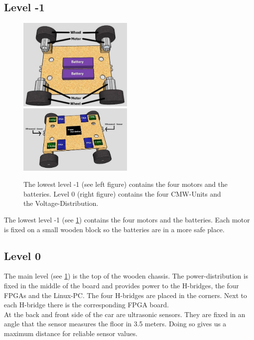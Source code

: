 \subsection{Level -1}

\begin{figure}[ht] 
	\includegraphics[width=0.5\textwidth]{figures/level-1_b.jpg}
	\includegraphics[width=0.5\textwidth]{figures/level0_b.jpg}
	\caption{The lowest level -1 (see left figure) contains the four motors and the batteries. Level 0 (right figure) contains the four CMW-Units and the Voltage-Distribution.} \label{Level-1and0}
\end{figure}

The lowest level -1 (see \ref{Level-1and0}) contains the four motors and the batteries. Each motor is fixed on a small wooden block so the batteries are in a more safe place.

\subsection{Level 0}

The main level (see \ref{Level-1and0}) is the top of the wooden chassis. The power-distribution is fixed in the middle of the board and provides power to the H-bridges, the four FPGAs and the Linux-PC. The four H-bridges are placed in the corners. Next to each H-bridge there is the corresponding FPGA board. \\

At the back and front side of the car are ultrasonic sensors. They are fixed in an angle that the sensor measures the floor in 3.5 meters. Doing so gives us a maximum distance for reliable sensor values.\\

